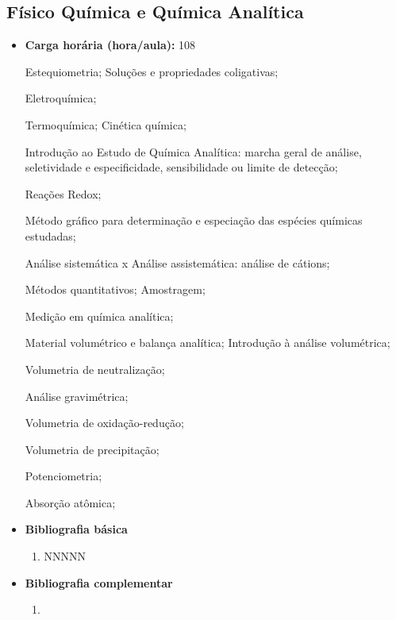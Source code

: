 \documentclass[11pt,fleqn]{book} %
\begin{document}
\newpage
\subsection{Físico Química e Química Analítica}\label{disc:analitica}
\begin{itemize}
	\item \textbf{Carga horária (hora/aula):} 108
	
	Estequiometria; Soluções e propriedades coligativas; 
	
	Eletroquímica;
	
	Termoquímica; Cinética química; 
	
	Introdução ao Estudo de Química Analítica: marcha geral de análise, seletividade e especificidade, sensibilidade ou limite de detecção; 
	
	Reações Redox; 
	
	Método gráfico para determinação e especiação das espécies químicas estudadas;
	
	Análise sistemática x Análise assistemática: análise de cátions;
	
	Métodos quantitativos; Amostragem; 
	
	Medição em química analítica; 
	
	Material volumétrico e balança analítica; Introdução à análise volumétrica; 
	
	Volumetria de neutralização; 
	
	Análise gravimétrica; 
	
	Volumetria de oxidação-redução; 
	
	Volumetria de precipitação; 
	
	Potenciometria; 
	
	Absorção atômica;
	\item \textbf{Bibliografia básica}
	\begin{enumerate}
		\item NNNNN
	\end{enumerate}
	\item \textbf{Bibliografia complementar}
	\begin{enumerate}
		\item 
	\end{enumerate}	
\end{itemize}
\end{document}
